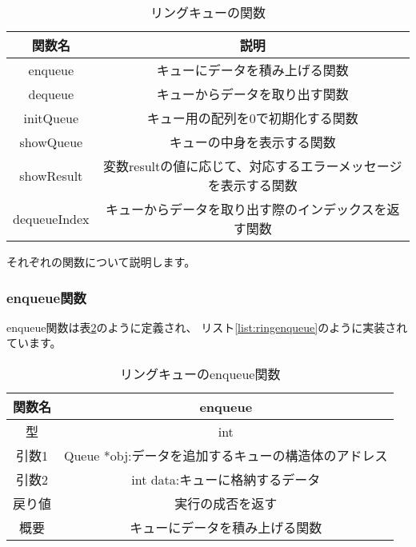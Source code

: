 \documentclass[a4j]{jarticle}
\begin{document}
\begin{table}[htbp]
  \centering
  \caption{リングキューの関数}
  \label{ringqueuefunc}
  \begin{tabular}{|c|c|}
    \hline
    関数名          & 説明                                 \\
    \hline
    enqueue      & キューにデータを積み上げる関数                    \\
    \hline
    dequeue      & キューからデータを取り出す関数                    \\
    \hline
    initQueue    & キュー用の配列を0で初期化する関数                  \\
    \hline
    showQueue    & キューの中身を表示する関数                      \\
    \hline
    showResult   & 変数resultの値に応じて、対応するエラーメッセージを表示する関数 \\
    \hline
    dequeueIndex & キューからデータを取り出す際のインデックスを返す関数         \\
    \hline
  \end{tabular}
\end{table}
それぞれの関数について説明します。

\subsubsection{enqueue関数}
enqueue関数は表\ref{table:ringenqueue}のように定義され、
リスト\ref{list:ringenqueue}のように実装されています。

\newpage

\begin{table}[htbp]
  \centering
  \caption{リングキューのenqueue関数}
  \label{table:ringenqueue}
  \begin{tabular}{|c|c|}
    \hline
    関数名 & enqueue                         \\
    \hline
    型   & int                             \\
    \hline
    引数1 & Queue *obj:データを追加するキューの構造体のアドレス \\
    \hline
    引数2 & int data:キューに格納するデータ            \\
    \hline
    戻り値 & 実行の成否を返す                        \\
    \hline
    概要  & キューにデータを積み上げる関数                 \\
    \hline
  \end{tabular}
\end{table}
\end{document}

